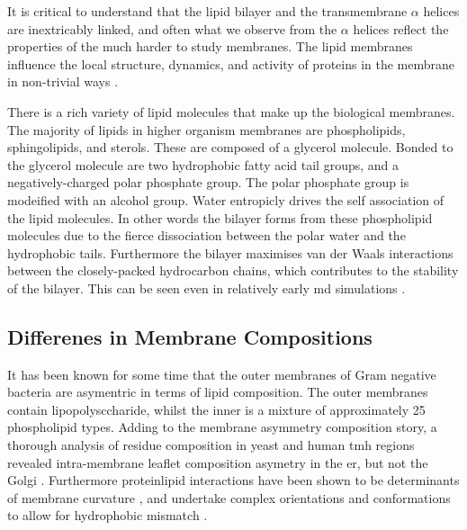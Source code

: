 It is critical to understand that the lipid bilayer and the transmembrane $\alpha$ helices are inextricably linked, and often what we observe from the $\alpha$ helices reflect the properties of the much harder to study membranes. The lipid membranes influence the local structure, dynamics, and activity of proteins in the membrane in non-trivial ways \cite{Bondar2010, Bondar2009, Jardon-Valadez2010, Kalvodova2005, Urban2005, White2001, Jensen2004, Henin2014}.%

There is a rich variety of lipid molecules that make up the biological membranes. The majority of lipids in higher organism membranes are phospholipids, sphingolipids, and sterols. These are composed of a glycerol molecule. Bonded to the glycerol molecule are two hydrophobic fatty acid tail groups, and a negatively-charged polar phosphate group. The polar phosphate group is modeified with an alcohol group. Water entropicly drives the self association of the lipid molecules. In other words the bilayer forms from these phospholipid molecules due to the fierce dissociation between the polar water and the hydrophobic tails. Furthermore the bilayer maximises van der Waals interactions between the closely-packed hydrocarbon chains, which contributes to the stability of the bilayer. This can be seen even in relatively early \gls{md} simulations \cite{Goetz1998}.

\subsection{Differenes in Membrane Compositions}

It has been known for some time that the outer membranes of Gram negative bacteria are asymentric in terms of lipid composition. The outer membranes contain lipopolysccharide, whilst the inner is a mixture of approximately 25 phospholipid types. Adding to the membrane asymmetry composition story, a thorough analysis of residue composition in yeast and human \gls{tmh} regions revealed intra-membrane leaflet composition asymetry in the \gls{er}, but not the Golgi \cite{Sharpe2010}. Furthermore protein\-lipid interactions have been shown to be determinants of membrane curvature \cite{Jensen2004}, and undertake complex orientations and conformations to allow for hydrophobic mismatch \cite{Planque2003}. %

